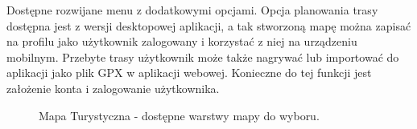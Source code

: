 Dostępne rozwijane menu z dodatkowymi opcjami. Opcja planowania trasy dostępna jest z wersji desktopowej aplikacji, a tak stworzoną mapę można zapisać na profilu jako użytkownik zalogowany i korzystać z niej na urządzeniu mobilnym. Przebyte trasy użytkownik może także nagrywać lub importować do aplikacji jako plik GPX w aplikacji webowej. Konieczne do tej funkcji jest założenie konta i zalogowanie użytkownika.
\begin{figure}[H]
    \centering
    \caption{Mapa Turystyczna - dostępne warstwy mapy do wyboru.}
    \label{mapatu:warstwy}
\end{figure}
